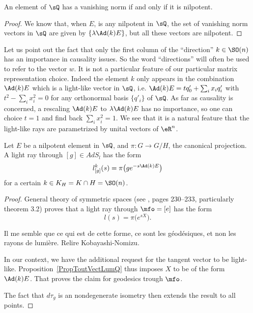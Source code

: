 \begin{corollary}		\label{CorNormZeroEQnil}
	An element of $\sQ$ has a vanishing norm if and only if it is nilpotent.
\end{corollary}

\begin{proof}
	We know that, when $E$, is any nilpotent in $\sQ$, the set of vanishing norm vectors in $\sQ$ are given by $\{ \lambda\Ad(k)E \}$, but all these vectors are nilpotent.
\end{proof}

Let us point out the fact that only the first column of the ``direction''{} $k\in \SO(n)$ has an importance in causality issues. So the word ``directions''{} will often be used to refer to the vector $w$. It is not a particular feature of our particular matrix representation choice. Indeed the element $k$ only appears in the combination $\Ad(k)E$ which is a light-like vector in $\sQ$, i.e. $\Ad(k)E=tq'_0+\sum_i x_iq'_i$ with $t^2-\sum_i x_i^2=0$ for any orthonormal basis $\{q'_i\}$ of $\sQ$. As far as causality is concerned, a rescaling $\Ad(k)E$ to $\lambda\Ad(k)E$ has no importance, so one can choice $t=1$ and find back $\sum_i x_i^2=1$. We see that it is a natural feature that the light-like rays are parametrized by  unital vectors of $\eR^n$.

\begin{lemma}		\label{LemGeodGenreLumiere}
	Let $E$ be a nilpotent element in $\sQ$, and $\pi: G \rightarrow G/H$, the canonical projection. A light ray through $[g]\in AdS_l$ has the form
	\begin{equation}
		l^k_{[g]}(s)=\pi\big( ge^{-s\Ad(k)E} \big)
	\end{equation}
	for a certain $k\in K_H=K\cap H=\SO(n)$.
	\label{lem:AdkEcone}
\end{lemma}

\begin{proof}
	General theory of symmetric spaces (see \cite{kobayashi2}, pages 230--233, particularly theorem 3.2) proves that a light ray through $\mfo=[e]$ has the form
	\[
		l(s)=\pi\big( e^{sX} \big).
	\]

	\begin{probleme}
		Il me semble que ce qui est de cette forme, ce sont les géodésiques, et non les rayons de lumière. Relire Kobayashi-Nomizu.
	\end{probleme}


	In our context, we have the additional request for the tangent vector to be light-like. Proposition~\ref{PropToutVectLumQ} thus imposes $X$ to be of the form $\Ad(k)E$. That proves the claim for geodesics trough $\mfo$.

	The fact that $d\tau_g$ is an nondegenerate isometry then extends the result to all points.

\end{proof}

